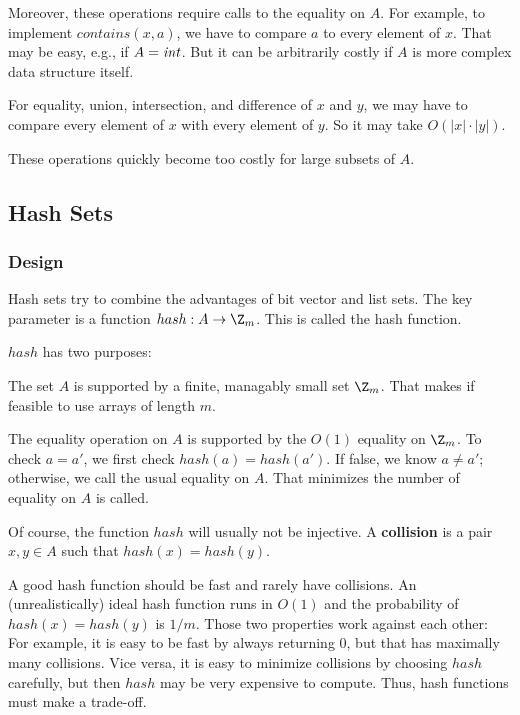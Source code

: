 Moreover, these operations require calls to the equality on $A$.
For example, to implement $contains(x,a)$, we have to compare $a$ to every element of $x$.
That may be easy, e.g., if $A=\mathit{int}$.
But it can be arbitrarily costly if $A$ is more complex data structure itself.

For equality, union, intersection, and difference of $x$ and $y$, we may have to compare every element of $x$ with every element of $y$.
So it may take $O(|x|\cdot|y|)$.

These operations quickly become too costly for large subsets of $A$.

\subsection{Hash Sets}\label{sec:ad:hashset}

\subsubsection{Design}
Hash sets try to combine the advantages of bit vector and list sets.
The key parameter is a function $hash:A\to \Z_m$.
This is called the hash function.

$hash$ has two purposes:
\begin{compactitem}
 \item The set $A$ is supported by a finite, managably small set $\Z_m$.
   That makes if feasible to use arrays of length $m$.
 \item The equality operation on $A$ is supported by the $O(1)$ equality on $\Z_m$.
   To check $a=a'$, we first check $hash(a)=hash(a')$.
   If false, we know $a\neq a'$; otherwise, we call the usual equality on $A$.
   That minimizes the number of equality on $A$ is called.
\end{compactitem}

Of course, the function $hash$ will usually not be injective.
A \textbf{collision} is a pair $x,y\in A$ such that $hash(x)=hash(y)$.

A good hash function should be fast and rarely have collisions.
An (unrealistically) ideal hash function runs in $O(1)$ and the probability of $hash(x)=hash(y)$ is $1/m$.
Those two properties work against each other: For example, it is easy to be fast by always returning $0$, but that has maximally many collisions.
Vice versa, it is easy to minimize collisions by choosing $hash$ carefully, but then $hash$ may be very expensive to compute.
Thus, hash functions must make a trade-off.

